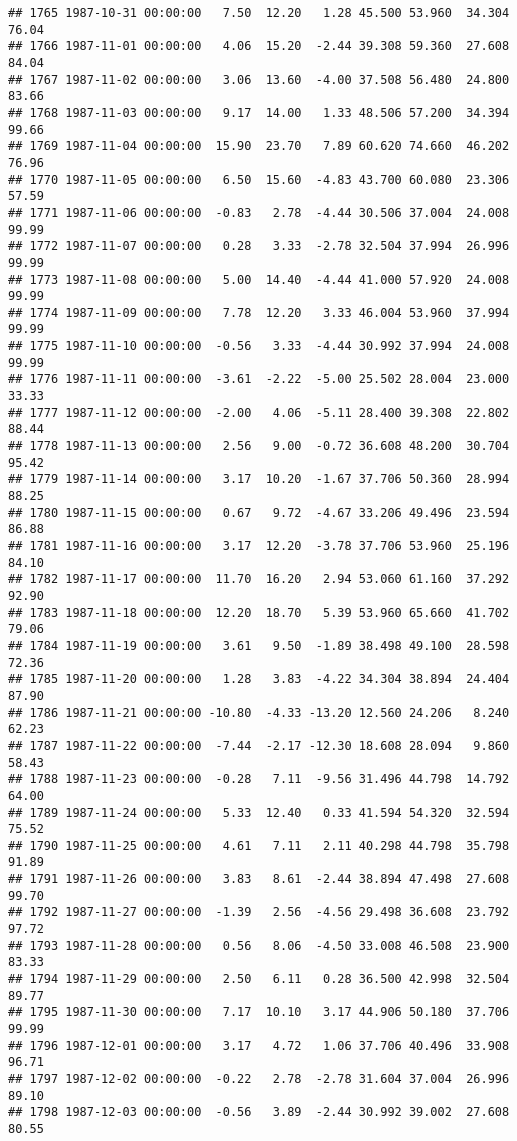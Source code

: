 \documentclass{article}\usepackage{graphicx, color}
\makeatletter
\newenvironment{kframe}{%
 \def\at@end@of@kframe{}%
 \ifinner\ifhmode%
  \def\at@end@of@kframe{\end{minipage}}%
  \begin{minipage}{\columnwidth}%
 \fi\fi%
 \def\FrameCommand##1{\hskip\@totalleftmargin \hskip-\fboxsep
 \colorbox{shadecolor}{##1}\hskip-\fboxsep
     \hskip-\linewidth \hskip-\@totalleftmargin \hskip\columnwidth}%
 \MakeFramed {\advance\hsize-\width
   \@totalleftmargin\z@ \linewidth\hsize
   \@setminipage}}%
 {\par\unskip\endMakeFramed%
 \at@end@of@kframe}
\newenvironment{knitrout}{}{} %
\makeatother
\begin{document}
\begin{knitrout}
\begin{kframe}
\begin{verbatim}
## 1765 1987-10-31 00:00:00   7.50  12.20   1.28 45.500 53.960  34.304  76.04
## 1766 1987-11-01 00:00:00   4.06  15.20  -2.44 39.308 59.360  27.608  84.04
## 1767 1987-11-02 00:00:00   3.06  13.60  -4.00 37.508 56.480  24.800  83.66
## 1768 1987-11-03 00:00:00   9.17  14.00   1.33 48.506 57.200  34.394  99.66
## 1769 1987-11-04 00:00:00  15.90  23.70   7.89 60.620 74.660  46.202  76.96
## 1770 1987-11-05 00:00:00   6.50  15.60  -4.83 43.700 60.080  23.306  57.59
## 1771 1987-11-06 00:00:00  -0.83   2.78  -4.44 30.506 37.004  24.008  99.99
## 1772 1987-11-07 00:00:00   0.28   3.33  -2.78 32.504 37.994  26.996  99.99
## 1773 1987-11-08 00:00:00   5.00  14.40  -4.44 41.000 57.920  24.008  99.99
## 1774 1987-11-09 00:00:00   7.78  12.20   3.33 46.004 53.960  37.994  99.99
## 1775 1987-11-10 00:00:00  -0.56   3.33  -4.44 30.992 37.994  24.008  99.99
## 1776 1987-11-11 00:00:00  -3.61  -2.22  -5.00 25.502 28.004  23.000  33.33
## 1777 1987-11-12 00:00:00  -2.00   4.06  -5.11 28.400 39.308  22.802  88.44
## 1778 1987-11-13 00:00:00   2.56   9.00  -0.72 36.608 48.200  30.704  95.42
## 1779 1987-11-14 00:00:00   3.17  10.20  -1.67 37.706 50.360  28.994  88.25
## 1780 1987-11-15 00:00:00   0.67   9.72  -4.67 33.206 49.496  23.594  86.88
## 1781 1987-11-16 00:00:00   3.17  12.20  -3.78 37.706 53.960  25.196  84.10
## 1782 1987-11-17 00:00:00  11.70  16.20   2.94 53.060 61.160  37.292  92.90
## 1783 1987-11-18 00:00:00  12.20  18.70   5.39 53.960 65.660  41.702  79.06
## 1784 1987-11-19 00:00:00   3.61   9.50  -1.89 38.498 49.100  28.598  72.36
## 1785 1987-11-20 00:00:00   1.28   3.83  -4.22 34.304 38.894  24.404  87.90
## 1786 1987-11-21 00:00:00 -10.80  -4.33 -13.20 12.560 24.206   8.240  62.23
## 1787 1987-11-22 00:00:00  -7.44  -2.17 -12.30 18.608 28.094   9.860  58.43
## 1788 1987-11-23 00:00:00  -0.28   7.11  -9.56 31.496 44.798  14.792  64.00
## 1789 1987-11-24 00:00:00   5.33  12.40   0.33 41.594 54.320  32.594  75.52
## 1790 1987-11-25 00:00:00   4.61   7.11   2.11 40.298 44.798  35.798  91.89
## 1791 1987-11-26 00:00:00   3.83   8.61  -2.44 38.894 47.498  27.608  99.70
## 1792 1987-11-27 00:00:00  -1.39   2.56  -4.56 29.498 36.608  23.792  97.72
## 1793 1987-11-28 00:00:00   0.56   8.06  -4.50 33.008 46.508  23.900  83.33
## 1794 1987-11-29 00:00:00   2.50   6.11   0.28 36.500 42.998  32.504  89.77
## 1795 1987-11-30 00:00:00   7.17  10.10   3.17 44.906 50.180  37.706  99.99
## 1796 1987-12-01 00:00:00   3.17   4.72   1.06 37.706 40.496  33.908  96.71
## 1797 1987-12-02 00:00:00  -0.22   2.78  -2.78 31.604 37.004  26.996  89.10
## 1798 1987-12-03 00:00:00  -0.56   3.89  -2.44 30.992 39.002  27.608  80.55

\end{verbatim}
\end{kframe}
\end{knitrout}
\end{document}
